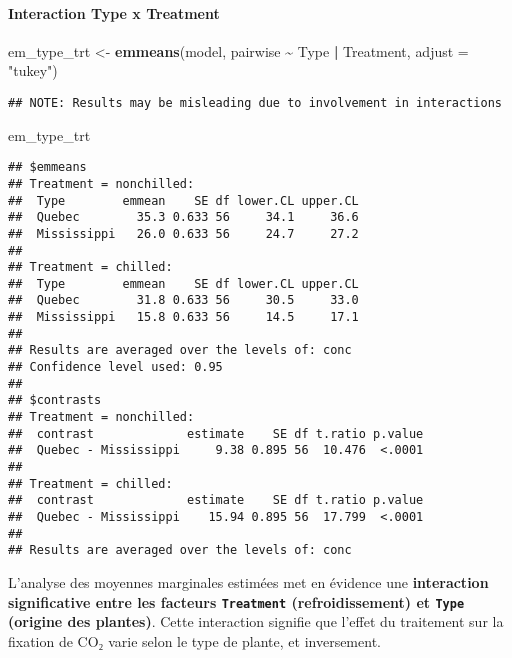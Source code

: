 \documentclass[
]{article}
\newenvironment{Shaded}{\begin{snugshade}}{\end{snugshade}}
\newcommand{\AttributeTok}[1]{\textcolor[rgb]{0.13,0.29,0.53}{#1}}
\newcommand{\FunctionTok}[1]{\textcolor[rgb]{0.13,0.29,0.53}{\textbf{#1}}}
\newcommand{\NormalTok}[1]{#1}
\newcommand{\OtherTok}[1]{\textcolor[rgb]{0.56,0.35,0.01}{#1}}
\newcommand{\SpecialCharTok}[1]{\textcolor[rgb]{0.81,0.36,0.00}{\textbf{#1}}}
\newcommand{\StringTok}[1]{\textcolor[rgb]{0.31,0.60,0.02}{#1}}
\begin{document}
\paragraph{Interaction Type x
Treatment}\label{interaction-type-x-treatment}

\begin{Shaded}
\begin{Highlighting}[]
\NormalTok{em\_type\_trt }\OtherTok{\textless{}{-}} \FunctionTok{emmeans}\NormalTok{(model, pairwise }\SpecialCharTok{\textasciitilde{}}\NormalTok{ Type }\SpecialCharTok{|}\NormalTok{ Treatment, }\AttributeTok{adjust =} \StringTok{"tukey"}\NormalTok{)}
\end{Highlighting}
\end{Shaded}

\begin{verbatim}
## NOTE: Results may be misleading due to involvement in interactions
\end{verbatim}

\begin{Shaded}
\begin{Highlighting}[]
\NormalTok{em\_type\_trt}
\end{Highlighting}
\end{Shaded}

\begin{verbatim}
## $emmeans
## Treatment = nonchilled:
##  Type        emmean    SE df lower.CL upper.CL
##  Quebec        35.3 0.633 56     34.1     36.6
##  Mississippi   26.0 0.633 56     24.7     27.2
## 
## Treatment = chilled:
##  Type        emmean    SE df lower.CL upper.CL
##  Quebec        31.8 0.633 56     30.5     33.0
##  Mississippi   15.8 0.633 56     14.5     17.1
## 
## Results are averaged over the levels of: conc 
## Confidence level used: 0.95 
## 
## $contrasts
## Treatment = nonchilled:
##  contrast             estimate    SE df t.ratio p.value
##  Quebec - Mississippi     9.38 0.895 56  10.476  <.0001
## 
## Treatment = chilled:
##  contrast             estimate    SE df t.ratio p.value
##  Quebec - Mississippi    15.94 0.895 56  17.799  <.0001
## 
## Results are averaged over the levels of: conc
\end{verbatim}

L'analyse des moyennes marginales estimées met en évidence une
\textbf{interaction significative entre les facteurs \texttt{Treatment}
(refroidissement) et \texttt{Type} (origine des plantes)}. Cette
interaction signifie que l'effet du traitement sur la fixation de CO₂
varie selon le type de plante, et inversement.
\end{document}
